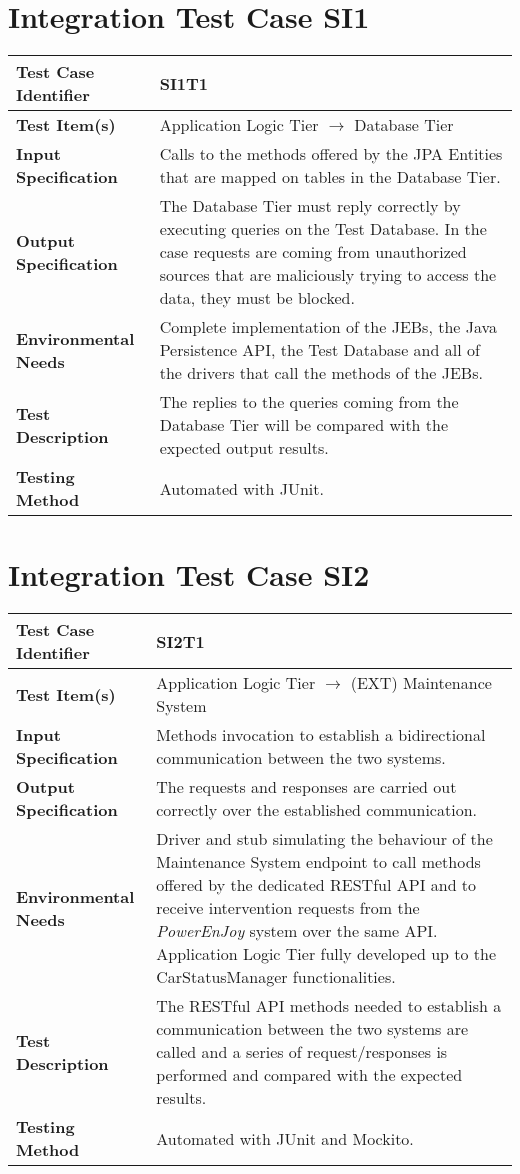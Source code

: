 \newpage
\section{Integration Test Case SI1}

\begin{longtable}{p{} | p{}}
\hline
\textbf{Test Case Identifier} & SI1T1\\
\hline
\textbf{Test Item(s)} & Application Logic Tier $\rightarrow$ Database Tier \\
\hline
\textbf{Input Specification} & Calls to the methods offered by the JPA Entities that are mapped on tables in the Database Tier. \\
\hline
\textbf{Output Specification} & The Database Tier must reply correctly by executing queries on the Test Database. In the case requests are coming from unauthorized sources that are maliciously trying to access the data, they must be blocked. \\
\hline
\textbf{Environmental Needs} & Complete implementation of the JEBs, the Java Persistence API, the Test Database and all of the drivers that call the methods of the JEBs. \\
\hline
\textbf{Test Description} & The replies to the queries coming from the Database Tier will be compared with the expected output results. \\
\hline
\textbf{Testing Method} & Automated with JUnit. \\
\hline
\end{longtable}

\section{Integration Test Case SI2}

\begin{longtable}{p{} | p{}}
\hline
\textbf{Test Case Identifier} & SI2T1\\
\hline
\textbf{Test Item(s)} & Application Logic Tier $\rightarrow$ (EXT) Maintenance System \\
\hline
\textbf{Input Specification} & Methods invocation to establish a bidirectional communication between the two systems. \\
\hline
\textbf{Output Specification} & The requests and responses are carried out correctly over the established communication. \\
\hline
\textbf{Environmental Needs} & Driver and stub simulating the behaviour of the Maintenance System endpoint to call methods offered by the dedicated RESTful API and to receive intervention requests from the \emph{PowerEnJoy} system over the same API. Application Logic Tier fully developed up to the CarStatusManager functionalities. \\
\hline
\textbf{Test Description} & The RESTful API methods needed to establish a communication between the two systems are called and a series of request/responses is performed and compared with the expected results. \\
\hline
\textbf{Testing Method} & Automated with JUnit and Mockito. \\
\hline
\end{longtable}


